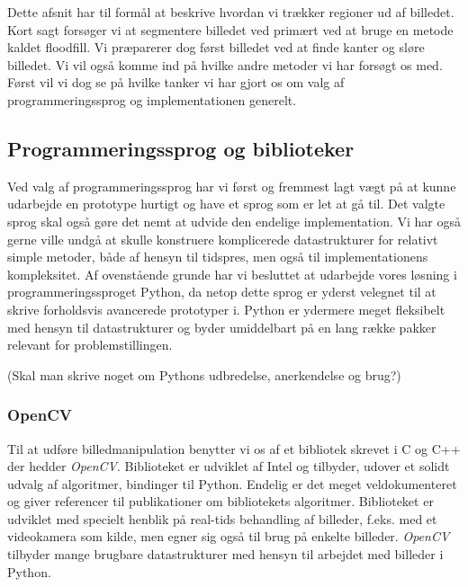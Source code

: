 {
{\sffamily Dette afsnit har til formål at beskrive hvordan vi trækker
regioner ud af billedet. Kort sagt forsøger vi at segmentere billedet
ved primært ved at bruge en metode kaldet floodfill. Vi præparerer dog
først billedet ved at finde kanter og sløre billedet. Vi vil også komme
ind på hvilke andre metoder vi har forsøgt os med. Først vil vi dog se
på hvilke tanker vi har gjort os om valg af programmeringssprog og
implementationen generelt.
}

\subsection{Programmeringssprog og biblioteker}
Ved valg af programmeringssprog har vi først og fremmest lagt vægt på at
kunne udarbejde en prototype hurtigt og have et sprog som er let at gå
til. Det valgte sprog skal også gøre det nemt at udvide den endelige
implementation. Vi har også gerne ville undgå at skulle konstruere
komplicerede datastrukturer for relativt simple metoder, både af hensyn
til tidspres, men også til implementationens kompleksitet. Af
ovenstående grunde har vi besluttet at udarbejde vores løsning i
programmeringssproget Python, da netop dette sprog er yderst velegnet
til at skrive forholdsvis avancerede prototyper i. Python er
ydermere meget fleksibelt med hensyn til datastrukturer og byder
umiddelbart på en lang række pakker relevant for problemstillingen.

(Skal man skrive noget om Pythons udbredelse, anerkendelse og brug?)

\subsubsection*{OpenCV}
Til at udføre billedmanipulation benytter vi os af et bibliotek skrevet
i C og C++ der hedder \emph{OpenCV}. Biblioteket er udviklet af Intel og
tilbyder, udover et solidt udvalg af algoritmer, bindinger til Python.
Endelig er det meget veldokumenteret og giver referencer til
publikationer om bibliotekets algoritmer. Biblioteket er udviklet med
specielt henblik på real-tids behandling af billeder, f.eks. med et
videokamera som kilde, men egner sig også til brug på enkelte billeder.
\emph{OpenCV} tilbyder mange brugbare datastrukturer med hensyn til
arbejdet med billeder i Python.

}
